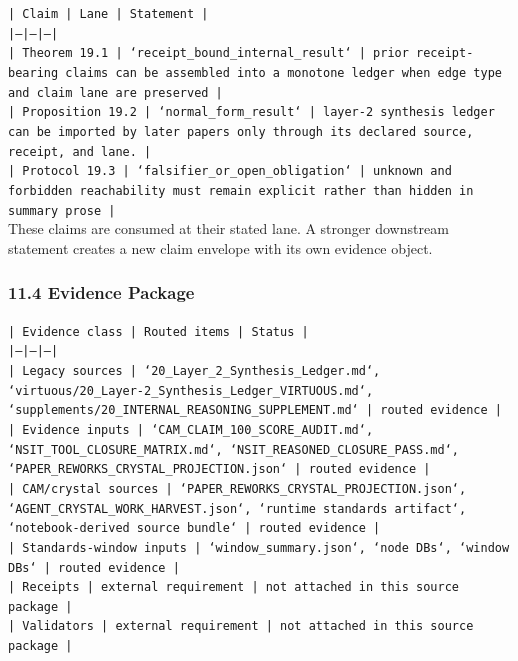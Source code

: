 \documentclass[11pt]{article}
\begin{document}
\noindent\texttt{| Claim | Lane | Statement |}\\
\noindent\texttt{|---|---|---|}\\
\noindent\texttt{| Theorem 19.1 | `receipt\_bound\_internal\_result` | prior receipt-bearing claims can be assembled into a monotone ledger when edge type and claim lane are preserved |}\\
\noindent\texttt{| Proposition 19.2 | `normal\_form\_result` | layer-2 synthesis ledger can be imported by later papers only through its declared source, receipt, and lane. |}\\
\noindent\texttt{| Protocol 19.3 | `falsifier\_or\_open\_obligation` | unknown and forbidden reachability must remain explicit rather than hidden in summary prose |}\\

These claims are consumed at their stated lane. A stronger downstream statement
creates a new claim envelope with its own evidence object.

\subsubsection*{11.4 Evidence Package}

\noindent\texttt{| Evidence class | Routed items | Status |}\\
\noindent\texttt{|---|---|---|}\\
\noindent\texttt{| Legacy sources | `20\_Layer\_2\_Synthesis\_Ledger.md`, `virtuous/20\_Layer-2\_Synthesis\_Ledger\_VIRTUOUS.md`, `supplements/20\_INTERNAL\_REASONING\_SUPPLEMENT.md` | routed evidence |}\\
\noindent\texttt{| Evidence inputs | `CAM\_CLAIM\_100\_SCORE\_AUDIT.md`, `NSIT\_TOOL\_CLOSURE\_MATRIX.md`, `NSIT\_REASONED\_CLOSURE\_PASS.md`, `PAPER\_REWORKS\_CRYSTAL\_PROJECTION.json` | routed evidence |}\\
\noindent\texttt{| CAM/crystal sources | `PAPER\_REWORKS\_CRYSTAL\_PROJECTION.json`, `AGENT\_CRYSTAL\_WORK\_HARVEST.json`, `runtime standards artifact`, `notebook-derived source bundle` | routed evidence |}\\
\noindent\texttt{| Standards-window inputs | `window\_summary.json`, `node DBs`, `window DBs` | routed evidence |}\\
\noindent\texttt{| Receipts | external requirement | not attached in this source package |}\\
\noindent\texttt{| Validators | external requirement | not attached in this source package |}\\
\end{document}
